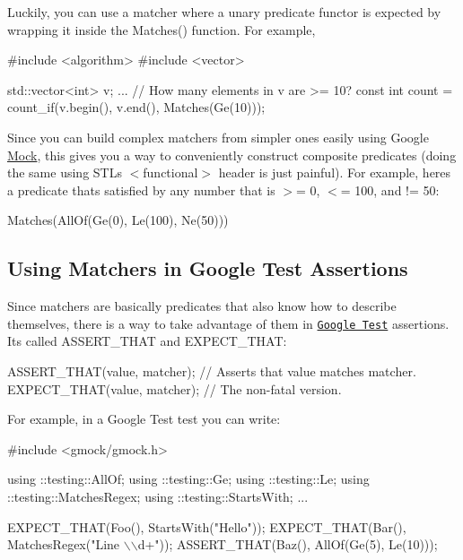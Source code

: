 Luckily, you can use a matcher where a unary predicate functor is expected by wrapping it inside the {\ttfamily Matches()} function. For example,


\begin{DoxyCode}
#include <algorithm>
#include <vector>

std::vector<int> v;
...
// How many elements in v are >= 10?
const int count = count\_if(v.begin(), v.end(), Matches(Ge(10)));
\end{DoxyCode}


Since you can build complex matchers from simpler ones easily using Google \hyperlink{class_mock}{Mock}, this gives you a way to conveniently construct composite predicates (doing the same using S\+TL\textquotesingle{}s {\ttfamily $<$functional$>$} header is just painful). For example, here\textquotesingle{}s a predicate that\textquotesingle{}s satisfied by any number that is $>$= 0, $<$= 100, and != 50\+:


\begin{DoxyCode}
Matches(AllOf(Ge(0), Le(100), Ne(50)))
\end{DoxyCode}


\subsection*{Using Matchers in Google Test Assertions}

Since matchers are basically predicates that also know how to describe themselves, there is a way to take advantage of them in \href{http://code.google.com/p/googletest/}{\tt Google Test} assertions. It\textquotesingle{}s called {\ttfamily A\+S\+S\+E\+R\+T\+\_\+\+T\+H\+AT} and {\ttfamily E\+X\+P\+E\+C\+T\+\_\+\+T\+H\+AT}\+:


\begin{DoxyCode}
ASSERT\_THAT(value, matcher);  // Asserts that value matches matcher.
EXPECT\_THAT(value, matcher);  // The non-fatal version.
\end{DoxyCode}


For example, in a Google Test test you can write\+:


\begin{DoxyCode}
#include <gmock/gmock.h>

using ::testing::AllOf;
using ::testing::Ge;
using ::testing::Le;
using ::testing::MatchesRegex;
using ::testing::StartsWith;
...

  EXPECT\_THAT(Foo(), StartsWith("Hello"));
  EXPECT\_THAT(Bar(), MatchesRegex("Line \(\backslash\)\(\backslash\)d+"));
  ASSERT\_THAT(Baz(), AllOf(Ge(5), Le(10)));
\end{DoxyCode}


